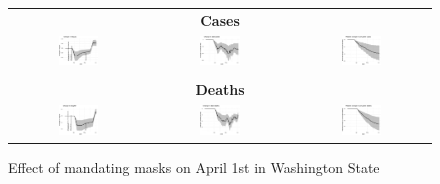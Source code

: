\documentclass[3p, longtitle]{elsarticle}
\theoremstyle{definition}
\begin{document}
\begin{figure}[ht]
  \caption{Effect of mandating masks on April 1st in Washington State \label{fig:WA-mask}}
  \begin{minipage}{\linewidth}
    \centering
    \begin{tabular}{ccc}
      \multicolumn{3}{c}{\textbf{Cases}} \\
      \includegraphics[width=0.31\textwidth]{tables_and_figures/Washington-mask-dgrowth_idx}
      &
        \includegraphics[width=0.31\textwidth]{tables_and_figures/Washington-mask-dcases_idx}
      &
        \includegraphics[width=0.31\textwidth]{tables_and_figures/Washington-mask-rcumu_idx}
      \\
      \\
      \multicolumn{3}{c}{\textbf{Deaths}}
      \\
      \includegraphics[width=0.31\textwidth]{tables_and_figures/Washington-mask-dgrowth_deaths_idx}
      &
        \includegraphics[width=0.31\textwidth]{tables_and_figures/Washington-mask-dcases_deaths_idx}
      & \includegraphics[width=0.31\textwidth]{tables_and_figures/Washington-mask-rcumu_deaths_idx}
    \end{tabular}


\end{minipage}
\end{figure}
\end{document}
